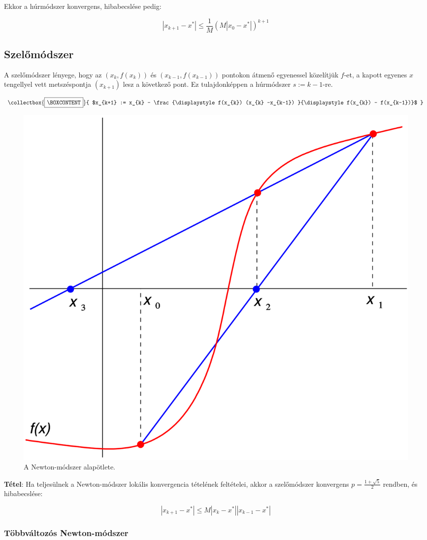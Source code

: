 \documentclass[tikz,12pt,margin=0px]{article}
\newcommand\ddfrac[2]{\frac{\displaystyle #1}{\displaystyle #2}}
\newcommand{\mybox}{%
    \collectbox{%
        \setlength{\fboxsep}{4pt}%
        \fbox{\BOXCONTENT}%
    }%
}
\begin{document}
	\noindent Ekkor a húrmódszer konvergens, hibabecslése pedig:
	
	\begin{displaymath}
		|x_{k+1} - x^{*}| \leq \ddfrac{1}{M}(M|x_{0}-x^{*}|)^{k+1}
	\end{displaymath}
	
	\subsection*{Szelőmódszer}
	A szelőmódszer lényege, hogy az $(x_{k},f(x_{k}))$ és $(x_{k-1},f(x_{k-1}))$ pontokon átmenő egyenessel közelítjük
	$f$-et, a kapott egyenes $x$ tengellyel vett metszéspontja $(x_{k+1})$ lesz a következő pont. Ez
	tulajdonképpen a húrmódszer $s := k - 1$-re.
	
	\begin{displaymath}
        \mybox{
		$x_{k+1} :=
		x_{k} -
		\ddfrac
		{f(x_{k}) (x_{k} -x_{k-1}) }
		{f(x_{k}) - f(x_{k-1})}$
        }
	\end{displaymath}
	
	\begin{figure}[H]
		\centering
		\includegraphics[width=0.5\linewidth]{img/szelomodszer.png}
		\caption{A Newton-módszer alapötlete.}
		\label{fig:newton_pelda}
	\end{figure}

	\noindent \textbf{Tétel}: Ha teljesülnek a Newton-módszer lokális konvergencia tételének feltételei, akkor a szelőmódszer
	konvergens $p = \ddfrac{1+\sqrt{5}}{2}$ rendben, és hibabecslése:
	
	\begin{displaymath}
		|x_{k+1} - x^{*}| \leq M|x_{k}-x^{*}||x_{k-1}-x^{*}|
	\end{displaymath}
	
	\subsubsection*{Többváltozós Newton-módszer}
	
\end{document}
